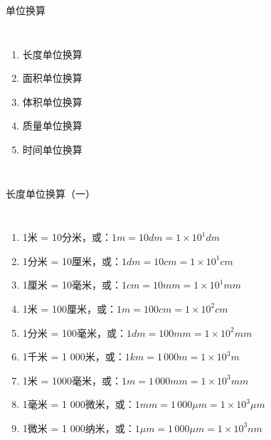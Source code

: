 \documentclass[aspectratio=169]{ctexbeamer} %
\date{\today}
\begin{document}
\begin{frame}[t]{单位换算}
\begin{columns}
\begin{enumerate}[label={\arabic*.}]
\item 长度单位换算
\item 面积单位换算
\item 体积单位换算
\item 质量单位换算
\item 时间单位换算
\end{enumerate}
\end{columns}
\end{frame}

\begin{frame}[t]{长度单位换算（一）}
\begin{columns}
\begin{enumerate}[label={\Alph*.}]
\item 1米 = 10分米，或：$1 m = 10 dm = 1 \times 10^1 dm$ \pause
\item 1分米 = 10厘米，或：$1 dm = 10 cm = 1 \times 10^1 cm$ \pause
\item 1厘米 = 10毫米，或：$1 cm = 10 mm = 1 \times 10^1 mm$ \pause
\item 1米 = 100厘米，或：$1 m = 100 cm = 1 \times 10^2 cm$ \pause
\item 1分米 = 100毫米，或：$1 dm = 100 mm = 1 \times 10^2 mm$ \pause
\item 1千米 = 1 000米，或：$1 km = 1 \, 000 m = 1 \times 10^3 m$ \pause
\item 1米 = 1000毫米，或：$1 m = 1 \, 000 mm = 1 \times 10^3 mm$ \pause
\item 1毫米 = 1 000微米，或：$1 mm = 1 \, 000 \mu m = 1 \times 10^3 \mu m$ \pause
\item 1微米 = 1 000纳米，或：$1 \mu m = 1 \, 000 \mu m = 1 \times 10^3 nm$ \pause
\end{enumerate}
\end{columns}
\end{frame}
\end{document}
